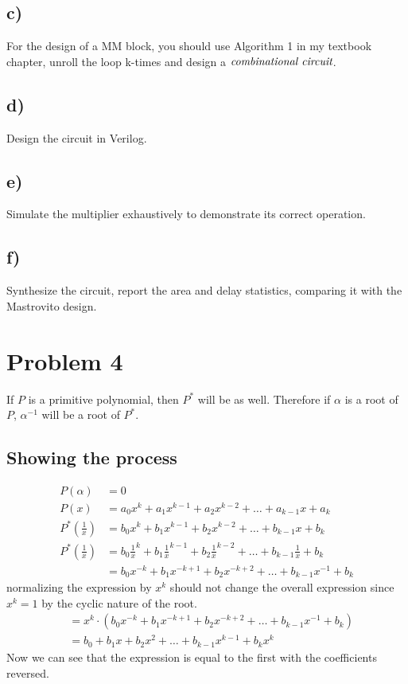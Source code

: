 \documentclass[a4paper,11pt]{exam}
\begin{document}
\subsection{c)}
\label{sec:orgdcb102d}
For the design of a MM block, you should use Algorithm 1 in my textbook chapter, unroll the loop k-times and design a \(\text{\it{combinational circuit}}\).

\subsection{d)}
\label{sec:org2381b0e}
Design the circuit in Verilog.

\subsection{e)}
\label{sec:orgb4ac96e}
Simulate the multiplier exhaustively to demonstrate its correct operation.

\subsection{f)}
\label{sec:orgdce4247}
Synthesize the circuit, report the area and delay statistics, comparing it with the Mastrovito
design.

\section{Problem 4}
\label{sec:orgff9155e}
If \(P\) is a primitive polynomial, then \(P^*\) will be as well. Therefore if \(\alpha\) is a root of \(P\), \(\alpha^{-1}\) will be a root of \(P^*\).
\subsection{Showing the process}
\label{sec:org4a6ee18}
\begin{align*}
  P(\alpha) &= 0 \\
  P(x) &= a_0x^{k} +  a_1x^{k-1} + a_2x^{k-2} + \ldots + a_{k-1}x + a_k\\
  P^*\left(\frac{1}{x}\right) &= b_0x^{k} +  b_1x^{k-1} + b_2x^{k-2} + \ldots + b_{k-1}x + b_k\\
  P^*\left(\frac{1}{x}\right) &= b_0\frac{1}{x}^{k} +  b_1\frac{1}{x}^{k-1} + b_2\frac{1}{x}^{k-2} + \ldots + b_{k-1}\frac{1}{x} + b_k \\
  &= b_0x^{-k} +  b_1x^{-k+1} + b_2x^{-k+2} + \ldots + b_{k-1}x^{-1} + b_k
  \end{align*}
  normalizing the expression by $x^k$ should not change the overall expression since $x^k = 1$ by the cyclic nature of the root.
  \begin{align*}
    &= x^k\cdot(b_0x^{-k} +  b_1x^{-k+1} + b_2x^{-k+2} + \ldots + b_{k-1}x^{-1} + b_k)\\
    &= b_0 +  b_1x + b_2x^{2} + \ldots + b_{k-1}x^{k-1} + b_kx^k 
  \end{align*}
  Now we can see that the expression is equal to the first with the coefficients reversed. 
\end{document}
